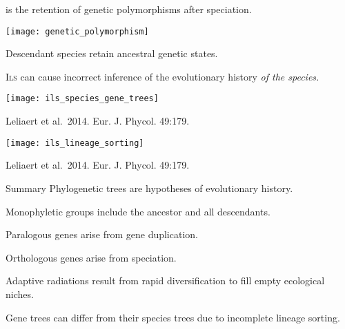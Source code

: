 \documentclass[t]{beamer}
\begin{document}
%
\begin{frame}[t,plain]{ is the retention of genetic polymorphisms after speciation.}

	\vspace{-0.5\baselineskip}
	
	\texttt{[image: genetic\_polymorphism]}
	
	\hangpara Descendant species retain ancestral genetic states.
	
	\hangpara I\textsc{ls} can cause incorrect inference of the evolutionary history \emph{of the species.}
\end{frame}
%

\begin{frame}[t,plain]


\texttt{[image: ils\_species\_gene\_trees]}

\vfilll

\tiny\hfill Leliaert et al.~2014. Eur. J. Phycol. 49:179.
\end{frame}
%
\begin{frame}[t,plain]


\texttt{[image: ils\_lineage\_sorting]}

\vfilll

\tiny\hfill Leliaert et al.~2014. Eur. J. Phycol. 49:179.
\end{frame}

\begin{frame}[t,plain]{Summary}
\hangpara Phylogenetic trees are hypotheses of evolutionary history.

\hangpara Monophyletic groups include the ancestor and all descendants.

\hangpara Paralogous genes arise from gene duplication.

\hangpara Orthologous genes arise from speciation.

\hangpara Adaptive radiations result from rapid diversification to fill empty ecological niches.

\hangpara Gene trees can differ from their species trees due to incomplete lineage sorting.

\end{frame}
\end{document}
